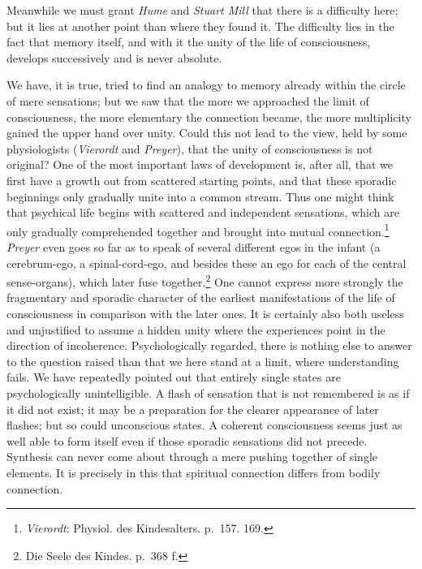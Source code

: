 \documentclass[12pt,a4paper]{book}
\newcommand{\opage}[1]{\marginnote{\footnotesize\textit{[#1]}}}
\begin{document}
Meanwhile we must grant \emph{Hume} and \emph{Stuart Mill} that there is a
difficulty here; but it lies at another point than where they found it.
The difficulty lies in the fact that memory itself, and with it the unity
of the life of consciousness, develops successively and is never absolute.

We have, it is true, tried to find an analogy to memory already within the
circle of mere sensations; but we saw that the more we approached the
limit of consciousness, the more elementary the connection became, the
more multiplicity gained the upper hand over unity. Could this not lead to
the view, held by some physiologists (\emph{Vierordt} and \emph{Preyer}),
that the unity of consciousness is not original? One of the most important
laws of development is, after all, that we first have a growth out from
scattered starting points, and that these sporadic beginnings only
gradually unite into a common stream. Thus
\opage{171}one might think that psychical life begins with scattered and
independent sensations, which are only gradually comprehended together
and brought into mutual connection.\footnote{\emph{Vierordt}: Physiol.
des Kindesalters. p.~157. 169.} \emph{Preyer} even goes so far as to
speak of several different egos in the infant (a cerebrum-ego, a
spinal-cord-ego, and besides these an ego for each of the central
sense-organs), which later fuse together.\footnote{Die Seele des Kindes.
p.~368 f.} One cannot express more strongly the fragmentary and sporadic
character of the earliest manifestations of the life of consciousness in
comparison with the later ones. It is certainly also both useless and
unjustified to assume a hidden unity where the experiences point in the
direction of incoherence. Psychologically regarded, there is nothing else
to answer to the question raised than that we here stand at a limit, where
understanding fails. We have repeatedly pointed out that entirely single
states are psychologically unintelligible. A flash of sensation that is
not remembered is as if it did not exist; it may be a preparation for the
clearer appearance of later flashes; but so could unconscious states. A
coherent consciousness seems just as well able to form itself even if
those sporadic sensations did not precede. Synthesis can never come about
through a mere pushing together of single elements. It is precisely in
this that spiritual connection differs from bodily connection.
\end{document}
